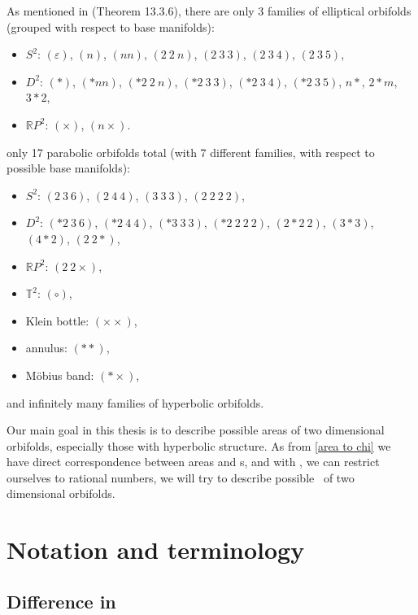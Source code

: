As mentioned in \cite{Thurston1979} (Theorem 13.3.6), there are only 3 families of elliptical 
orbifolds (grouped with respect to base manifolds):
\begin{itemize}
\item $S^2$: $(\varepsilon)$, $(n)$, $(nn)$, $(2\ 2\ n)$, $(2\ 3\ 3)$, $(2\ 3\ 4)$, 
 $(2\ 3\ 5)$,
\item $D^2$: $(*)$, $(*nn)$, $(*2\ 2\ n)$, $(*2\ 3\ 3)$, $(*2\ 3\ 4)$, 
$(*2\ 3\  5)$, $n*$, $2*m$, $3*2$,
\item $\mathbb{R}P^2$: $(\times)$, $(n\times)$.
\end{itemize}
only 17 parabolic orbifolds total (with 7 different families, with respect to 
possible base manifolds):
\begin{itemize}
\item $S^2$: $(2\ 3\ 6)$, $(2\ 4\ 4)$,  $(3\ 3\ 3)$,  $(2\ 2\ 2\ 2)$, 
\item $D^2$: $(*2\ 3\ 6)$,  $(*2\ 4\ 4)$, $(*3\ 3\ 3)$,  $(*2\ 2\ 2\ 2)$,  
$(2*2\ 2)$,  $(3*3)$,  $(4*2)$,  $(2\ 2*)$, 
\item $\mathbb{R}P^2$: $(2\ 2\times)$, 
\item $\mathbb{T}^2$: $(\circ)$, 
\item Klein bottle: $(\times\times)$, 
\item annulus: $(**)$, 
\item Möbius band: $(*\times)$, 
\end{itemize}
and infinitely many families of hyperbolic orbifolds. 

Our main goal in this thesis is to describe possible areas of two dimensional orbifolds, 
especially those with hyperbolic structure. 
As from \ref{area to chi} we have direct correspondence 
between areas and \Eoc s, and with \Eoc, we can restrict ourselves to rational numbers, 
we will try to describe possible \Eoc\ of two dimensional orbifolds.  


\section{Notation and terminology}
\subsection{Difference in \Eoc}

